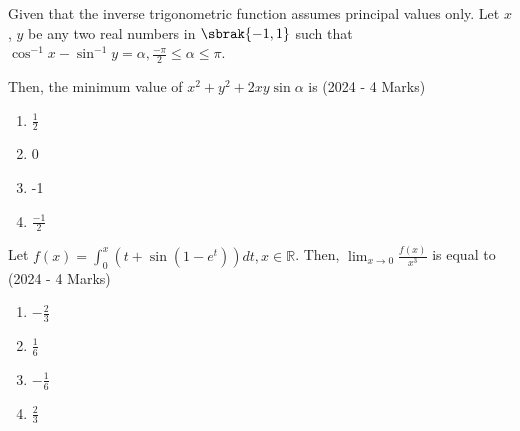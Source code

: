     \item{
			
			Given that the inverse trigonometric function assumes principal values only. Let $x$, $y$ be any two real numbers in $\sbrak{-1,1}$ such that $\cos ^{-1} x-\sin ^{-1} y=\alpha, \frac{-\pi}{2} \leq \alpha \leq \pi$.
			
			Then, the minimum value of $x^{2}+y^{2}+2 x y \sin \alpha$ is
			\text{   }\hfill
			{(2024 - 4 Marks)}
			\begin{multicols}{4}
				\begin{enumerate}
						\item $\frac{1}{2}$
						\item 0
						\item -1
						\item $\frac{-1}{2}$
				\end{enumerate}
			\end{multicols}
			
		}

    \item{
        
           
           	Let $f(x)=\int_{0}^{x}\left(t+\sin \left(1-e^{t}\right)\right) d t, x \in \mathbb{R}$. Then, $\lim _{x \rightarrow 0} \frac{f(x)}{x^{3}}$ is equal to\\ \text{ }
             \hfill
              {(2024 - 4 Marks)}
			\begin{multicols}{2}              
	              		\begin{enumerate}
	              			\item $-\frac{2}{3}$
	              			\item $\frac{1}{6}$
	              			\item $-\frac{1}{6}$
	              			\item $\frac{2}{3}$
	              	\end{enumerate}
  			\end{multicols}      
        }



